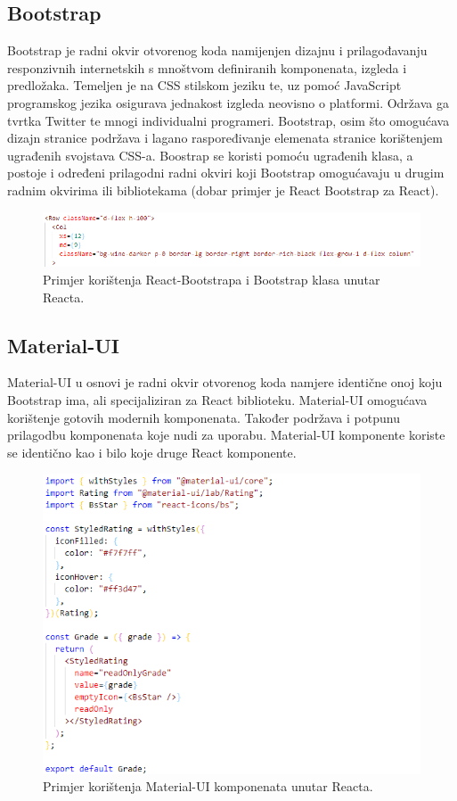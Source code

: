 \documentclass[times, utf8, zavrsni]{fer}
\begin{document}
			\subsection{Bootstrap}
			Bootstrap je radni okvir  otvorenog koda namijenjen dizajnu i prilagođavanju responzivnih internetskih s mnoštvom definiranih komponenata, izgleda i predložaka. Temeljen je na CSS stilskom jeziku te, uz pomoć JavaScript programskog jezika osigurava jednakost izgleda neovisno o platformi. Održava ga tvrtka Twitter te mnogi individualni programeri. Bootstrap, osim što omogućava dizajn stranice podržava i lagano raspoređivanje elemenata stranice korištenjem ugrađenih svojstava CSS-a. Boostrap se koristi pomoću ugrađenih klasa, a postoje i određeni prilagodni radni okviri koji Bootstrap omogućavaju u drugim radnim okvirima ili bibliotekama (dobar primjer je React Bootstrap za React).
			\begin{figure}[H]
				\centering
				\includegraphics[width=\linewidth]{pictures/prikazi/Bootstrap.png}
				\caption{Primjer korištenja React-Bootstrapa i Bootstrap klasa unutar Reacta.}
				\label{fig:bootstrap}
			\end{figure}
			
			\subsection{Material-UI}
			Material-UI u osnovi je radni okvir otvorenog koda namjere identične onoj koju Bootstrap ima, ali specijaliziran za React biblioteku. Material-UI omogućava korištenje gotovih modernih komponenata. Također podržava i potpunu prilagodbu komponenata koje nudi za uporabu. Material-UI komponente koriste se identično kao i bilo koje druge React komponente.
			\begin{figure}[H]
				\centering
				\includegraphics[width=\linewidth]{pictures/prikazi/MaterialUI.png}
				\caption{Primjer korištenja Material-UI komponenata unutar Reacta.}
				\label{fig:materialUI}
			\end{figure}
			
\end{document}
